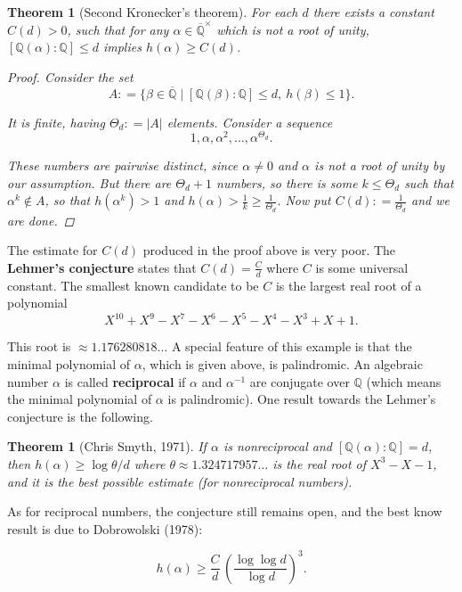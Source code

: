\documentclass{article}
\newcommand{\term}{\textbf}
\newcommand{\dfn}{\mathrel{\mathop:}=}
\newcommand{\QQ}{\mathbb{Q}}
\theoremstyle{myplain}
\newtheorem{theorem}[proposition]{Theorem}
\theoremstyle{mydefinition}
\begin{document}
\begin{theorem}[Second Kronecker's theorem]
  For each $d$ there exists a constant $C (d) > 0$, such that for any
  $\alpha \in \overline{\QQ}^\times$ which is not a root of unity,
  $[\QQ (\alpha) : \QQ] \le d$ implies $h (\alpha) \ge C (d)$.

  \begin{proof}
    Consider the set
    \[ A \dfn \{ \beta \in \overline{\QQ} \mid [\QQ (\beta) : \QQ] \le d, ~ h (\beta) \le 1 \}. \]

    It is finite, having $\Theta_d \dfn |A|$ elements. Consider a sequence
    \[ 1, \alpha, \alpha^2, \ldots, \alpha^{\Theta_d}. \]

    These numbers are pairwise distinct, since $\alpha \ne 0$ and $\alpha$ is
    not a root of unity by our assumption. But there are $\Theta_d + 1$ numbers,
    so there is some $k \le \Theta_d$ such that $\alpha^k \notin A$, so that
    $h (\alpha^k) > 1$ and $h (\alpha) > \frac{1}{k} \ge
    \frac{1}{\Theta_d}$. Now put $C (d) \dfn \frac{1}{\Theta_d}$ and we are
    done.
  \end{proof}
\end{theorem}

The estimate for $C (d)$ produced in the proof above is very poor. The
\term{Lehmer's conjecture} states that $C (d) = \frac{C}{d}$ where $C$ is some
universal constant. The smallest known candidate to be $C$ is the largest real
root of a polynomial
\[ X^{10}+X^9-X^7-X^6-X^5-X^4-X^3+X+1. \]

This root is $\approx 1.176280818\dots$ A special feature of this example is
that the minimal polynomial of $\alpha$, which is given above, is
palindromic. An algebraic number $\alpha$ is called \term{reciprocal} if
$\alpha$ and $\alpha^{-1}$ are conjugate over $\QQ$ (which means the minimal
polynomial of $\alpha$ is palindromic). One result towards the Lehmer's
conjecture is the following.

\begin{theorem}[Chris Smyth, 1971]
  If $\alpha$ is nonreciprocal and $[\QQ (\alpha) : \QQ] = d$, then
  $h (\alpha) \ge \log \theta/d$ where $\theta \approx 1.324717957\dots$ is the
  real root of $X^3 - X - 1$, and it is the best possible estimate (for
  nonreciprocal numbers).
\end{theorem}

As for reciprocal numbers, the conjecture still remains open, and the best know
result is due to Dobrowolski (1978):

\[ h (\alpha) \ge \frac{C}{d} \, \left(\frac{\log \log d}{\log d}\right)^3. \]
\end{document}
